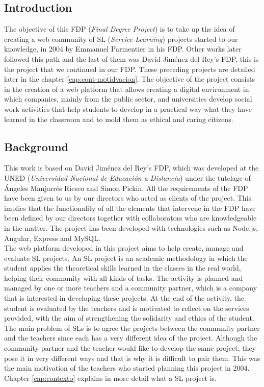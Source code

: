 \documentclass[11pt]{book}
\begin{document}
\begin{itemize}
		\chapter{Introduction}
		The objective of this FDP (\textit{Final Degree Project}) is to take up the idea of creating a web community of SL (\emph{Service-Learning}) projects started to our knowledge, in 2004 by Emmanuel Parmentier in his FDP. Other works later followed this path and the last of them was David Jiménez del Rey's FDP, this is the project that we continued in our FDP. These preceding projects are detailed later in the chapter \ref{cap:cont-motidvacion}. The objective of the project consists in the creation of a web platform that allows creating a digital environment in which companies, mainly from the public sector, and universities develop social work activities that help students to develop in a practical way what they have learned in the classroom and to mold them as ethical and caring citizens.
		
		\section{Background}
		This work is based on David Jiménez del Rey's FDP, which was developed at the UNED (\emph{Universidad Nacional de Educación a Distancia}) under the tutelage of Ángeles Manjarrés Riesco and Simon Pickin. All the requirements of the FDP have been given to us by our directors who acted as clients of the project. This implies that the functionality of all the elements that intervene in the FDP have been defined by our directors together with collaborators who are knowledgeable in the matter. The project has been developed with technologies such as Node.js, Angular, Express and MySQL. \\
		The web platform developed in this project aims to help create, manage and evaluate SL projects. An SL project is an academic methodology in which the student applies the theoretical skills learned in the classes in the real world, helping their community with all kinds of tasks. The activity is planned and managed by one or more teachers and a community partner, which is a company that is interested in developing these projects. At the end of the activity, the student is evaluated by the teachers and is motivated to reflect on the services provided, with the aim of strengthening the solidarity and ethics of the student. \\
		The main problem of SLs is to agree the projects between the community partner and the teachers since each has a very different idea of the project. Although the community partner and the teacher would like to develop the same project, they pose it in very different ways and that is why it is difficult to pair them. This was the main motivation of the teachers who started planning this project in 2004. Chapter \ref{cap:contexto} explains in more detail what a SL project is. \\
		

\end{itemize}
\end{document}
